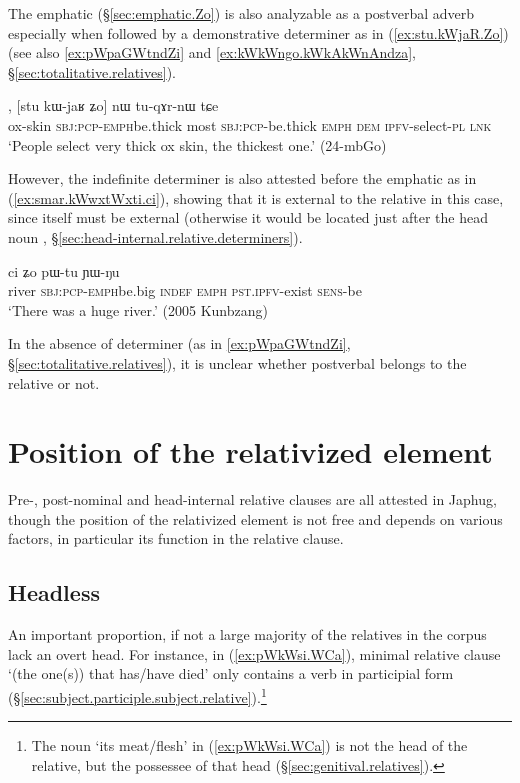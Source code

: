 The emphatic  (§\ref{sec:emphatic.Zo}) is also analyzable as a postverbal adverb especially when followed by a demonstrative determiner as in (\ref{ex:stu.kWjaR.Zo}) (see also \ref{ex:pWpaGWtndZi} and \ref{ex:kWkWngo.kWkAkWnAndza}, §\ref{sec:totalitative.relatives}).

\begin{exe}
\ex \label{ex:stu.kWjaR.Zo}
, [stu kɯ-jaʁ ʑo] nɯ tu-qɤr-nɯ tɕe \\
ox-skin \textsc{sbj}:\textsc{pcp}-\textsc{emph}\redp{}be.thick most \textsc{sbj}:\textsc{pcp}-be.thick \textsc{emph} \textsc{dem} \textsc{ipfv}-select-\textsc{pl} \textsc{lnk} \\
\glt `People select very thick ox skin, the thickest one.' (24-mbGo)
\end{exe} 

However, the indefinite determiner  is also attested before the emphatic  as in (\ref{ex:smar.kWwxtWxti.ci}), showing that it is external to the relative in this case, since  itself must be external (otherwise it would be located just after the head noun , §\ref{sec:head-internal.relative.determiners}).

\begin{exe}
\ex \label{ex:smar.kWwxtWxti.ci}
 ci ʑo pɯ-tu ɲɯ-ŋu \\
river \textsc{sbj}:\textsc{pcp}-\textsc{emph}\redp{}be.big \textsc{indef} \textsc{emph} \textsc{pst}.\textsc{ipfv}-exist \textsc{sens}-be \\
\glt `There was a huge river.' (2005 Kunbzang)
\end{exe} 

In the absence of determiner (as in \ref{ex:pWpaGWtndZi}, §\ref{sec:totalitative.relatives}), it is unclear whether postverbal  belongs to the relative or not.

\section{Position of the relativized element} \label{sec:position.head.relative}
Pre-, post-nominal and head-internal relative clauses are all attested in Japhug, though the position of the relativized element is not free and depends on various factors, in particular its function in the relative clause.

\subsection{Headless} \label{sec:headless.relative}
An important proportion, if not a large majority of the relatives in the corpus lack an overt head. For instance, in (\ref{ex:pWkWsi.WCa}), minimal relative clause  `(the one(s)) that has/have died' only contains a verb in participial form (§\ref{sec:subject.participle.subject.relative}).\footnote{The noun  `its meat/flesh' in (\ref{ex:pWkWsi.WCa}) is not the head of the relative, but the possessee of that head (§\ref{sec:genitival.relatives}). }

